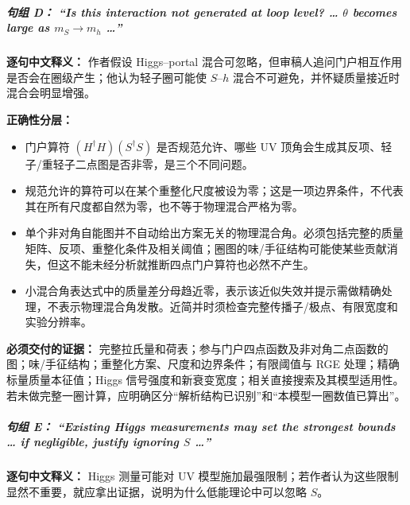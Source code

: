 \documentclass[
]{article}
\providecommand{\tightlist}{%
  \setlength{\itemsep}{0pt}\setlength{\parskip}{0pt}}
\begin{document}
\subparagraph{\texorpdfstring{句组 D： ``Is this interaction not
generated at loop level? \ldots{} \(\theta\) becomes large as
\(m_S\to m_h\)
\ldots{}''}{句组 D： ``Is this interaction not generated at loop level? \ldots{} \textbackslash theta becomes large as m\_S\textbackslash to m\_h \ldots''}}\label{ux53e5ux7ec4-d-is-this-interaction-not-generated-at-loop-level-theta-becomes-large-as-m_sto-m_h}

\textbf{逐句中文释义：} 作者假设 Higgs--portal
混合可忽略，但审稿人追问门户相互作用是否会在圈级产生；他认为轻子圈可能使
\(S\)--\(h\) 混合不可避免，并怀疑质量接近时混合会明显增强。

\textbf{正确性分层：}

\begin{itemize}
\tightlist
\item
  门户算符 \((H^\dagger H)(S^\dagger S)\) 是否规范允许、哪些 UV
  顶角会生成其反项、轻子/重轻子二点图是否非零，是三个不同问题。
\item
  规范允许的算符可以在某个重整化尺度被设为零；这是一项边界条件，不代表其在所有尺度都自然为零，也不等于物理混合严格为零。
\item
  单个非对角自能图并不自动给出方案无关的物理混合角。必须包括完整的质量矩阵、反项、重整化条件及相关阈值；圈图的味/手征结构可能使某些贡献消失，但这不能未经分析就推断四点门户算符也必然不产生。
\item
  小混合角表达式中的质量差分母趋近零，表示该近似失效并提示需做精确处理，不表示物理混合角发散。近简并时须检查完整传播子/极点、有限宽度和实验分辨率。
\end{itemize}

\textbf{必须交付的证据：}
完整拉氏量和荷表；参与门户四点函数及非对角二点函数的图；味/手征结构；重整化方案、尺度和边界条件；有限阈值与
RGE 处理；精确标量质量本征值；Higgs
信号强度和新衰变宽度；相关直接搜索及其模型适用性。若未做完整一圈计算，应明确区分``解析结构已识别''和``本模型一圈数值已算出''。

\subparagraph{\texorpdfstring{句组 E： ``Existing Higgs measurements may
set the strongest bounds \ldots{} if negligible, justify ignoring \(S\)
\ldots{}''}{句组 E： ``Existing Higgs measurements may set the strongest bounds \ldots{} if negligible, justify ignoring S \ldots''}}\label{ux53e5ux7ec4-e-existing-higgs-measurements-may-set-the-strongest-bounds-if-negligible-justify-ignoring-s}

\textbf{逐句中文释义：} Higgs 测量可能对 UV
模型施加最强限制；若作者认为这些限制显然不重要，就应拿出证据，说明为什么低能理论中可以忽略
\(S\)。
\end{document}
